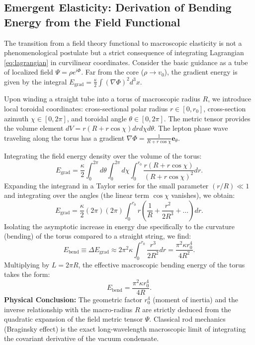 \documentclass[11pt,a4paper]{article}
\begin{document}
\subsection{Emergent Elasticity: Derivation of Bending Energy from the Field Functional}
The transition from a field theory functional to macroscopic elasticity is not a phenomenological postulate but a strict consequence of integrating Lagrangian \eqref{eq:lagrangian} in curvilinear coordinates.
Consider the basic guidance as a tube of localized field $\Psi = \rho e^{i\Phi}$. Far from the core ($\rho \to v_0$), the gradient energy is given by the integral $E_{\text{grad}} = \frac{\kappa}{2} \int (\nabla \Phi)^2 d^3x$.

Upon winding a straight tube into a torus of macroscopic radius $R$, we introduce local toroidal coordinates: cross-sectional polar radius $r \in [0, r_0]$, cross-section azimuth $\chi \in [0, 2\pi]$, and toroidal angle $\theta \in [0, 2\pi]$. The metric tensor provides the volume element $dV = r(R + r\cos\chi) dr d\chi d\theta$.
The lepton phase wave traveling along the torus has a gradient $\nabla \Phi = \frac{1}{R + r\cos\chi} \mathbf{e}_\theta$.

Integrating the field energy density over the volume of the torus:
\begin{equation}
	E_{\text{grad}} = \frac{\kappa}{2} \int_0^{2\pi} d\theta \int_0^{2\pi} d\chi \int_0^{r_0} \frac{r(R + r\cos\chi)}{(R + r\cos\chi)^2} dr.
\end{equation}
Expanding the integrand in a Taylor series for the small parameter $(r/R) \ll 1$ and integrating over the angles (the linear term $\cos\chi$ vanishes), we obtain:
\begin{equation}
	E_{\text{grad}} = \frac{\kappa}{2} (2\pi) (2\pi) \int_0^{r_0} r \left( \frac{1}{R} + \frac{r^2}{2R^3} + \dots \right) dr.
\end{equation}
Isolating the asymptotic increase in energy due specifically to the curvature (bending) of the torus compared to a straight string, we find:
\begin{equation}
	E_{\text{bend}} \equiv \Delta E_{\text{grad}} \approx 2\pi^2 \kappa \int_0^{r_0} \frac{r^3}{2R^2} dr = \frac{\pi^2 \kappa r_0^4}{4 R^2}.
\end{equation}
Multiplying by $L = 2\pi R$, the effective macroscopic bending energy of the torus takes the form:
\begin{equation}
	E_{\text{bend}} = \frac{\pi^2 \kappa r_0^4}{4R}.
\end{equation}
\textbf{Physical Conclusion:} The geometric factor $r_0^4$ (moment of inertia) and the inverse relationship with the macro-radius $R$ are strictly deduced from the quadratic expansion of the field metric tensor $\Psi$. Classical rod mechanics (Braginsky effect) is the exact long-wavelength macroscopic limit of integrating the covariant derivative of the vacuum condensate.
\end{document}
